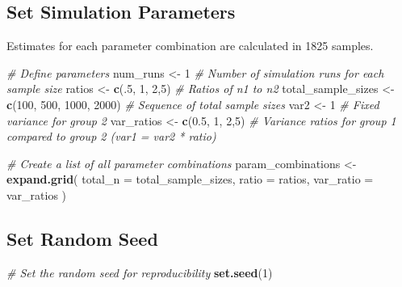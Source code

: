 \documentclass[
  letterpaper,
  DIV=11,
  numbers=noendperiod]{scrartcl}
\newenvironment{Shaded}{\begin{snugshade}}{\end{snugshade}}
\newcommand{\AttributeTok}[1]{\textcolor[rgb]{0.13,0.29,0.53}{#1}}
\newcommand{\CommentTok}[1]{\textcolor[rgb]{0.56,0.35,0.01}{\textit{#1}}}
\newcommand{\DecValTok}[1]{\textcolor[rgb]{0.00,0.00,0.81}{#1}}
\newcommand{\FloatTok}[1]{\textcolor[rgb]{0.00,0.00,0.81}{#1}}
\newcommand{\FunctionTok}[1]{\textcolor[rgb]{0.13,0.29,0.53}{\textbf{#1}}}
\newcommand{\NormalTok}[1]{#1}
\newcommand{\OtherTok}[1]{\textcolor[rgb]{0.56,0.35,0.01}{#1}}
\begin{document}
\subsection{Set Simulation Parameters}\label{set-simulation-parameters}

Estimates for each parameter combination are calculated in 1825 samples.

\begin{Shaded}
\begin{Highlighting}[]
\CommentTok{\# Define parameters}
\NormalTok{num\_runs }\OtherTok{\textless{}{-}} \DecValTok{1}  \CommentTok{\# Number of simulation runs for each sample size}
\NormalTok{ratios }\OtherTok{\textless{}{-}} \FunctionTok{c}\NormalTok{(.}\DecValTok{5}\NormalTok{, }\DecValTok{1}\NormalTok{, }\DecValTok{2}\NormalTok{,}\DecValTok{5}\NormalTok{)  }\CommentTok{\# Ratios of n1 to n2}
\NormalTok{total\_sample\_sizes }\OtherTok{\textless{}{-}} \FunctionTok{c}\NormalTok{(}\DecValTok{100}\NormalTok{, }\DecValTok{500}\NormalTok{, }\DecValTok{1000}\NormalTok{, }\DecValTok{2000}\NormalTok{)  }\CommentTok{\# Sequence of total sample sizes}
\NormalTok{var2 }\OtherTok{\textless{}{-}} \DecValTok{1}  \CommentTok{\# Fixed variance for group 2}
\NormalTok{var\_ratios }\OtherTok{\textless{}{-}} \FunctionTok{c}\NormalTok{(}\FloatTok{0.5}\NormalTok{, }\DecValTok{1}\NormalTok{, }\DecValTok{2}\NormalTok{,}\DecValTok{5}\NormalTok{)  }\CommentTok{\# Variance ratios for group 1 compared to group 2 (var1 = var2 * ratio)}

\CommentTok{\# Create a list of all parameter combinations}
\NormalTok{param\_combinations }\OtherTok{\textless{}{-}} \FunctionTok{expand.grid}\NormalTok{(}
  \AttributeTok{total\_n =}\NormalTok{ total\_sample\_sizes,}
  \AttributeTok{ratio =}\NormalTok{ ratios,}
  \AttributeTok{var\_ratio =}\NormalTok{ var\_ratios}
\NormalTok{)}
\end{Highlighting}
\end{Shaded}

\subsection{Set Random Seed}\label{set-random-seed}

\begin{Shaded}
\begin{Highlighting}[]
\CommentTok{\# Set the random seed for reproducibility}
\FunctionTok{set.seed}\NormalTok{(}\DecValTok{1}\NormalTok{)}
\end{Highlighting}
\end{Shaded}
\end{document}
